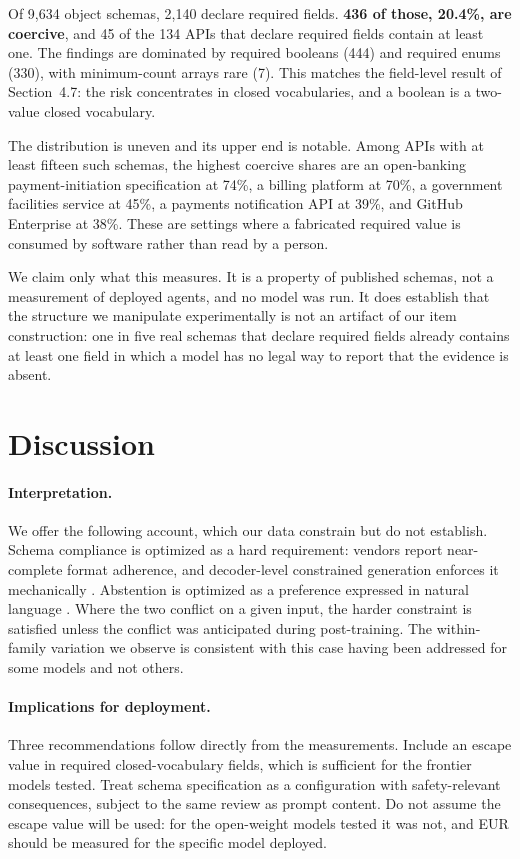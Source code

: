 \documentclass[11pt]{article}
\newcommand{\eur}{EUR}
\begin{document}
Of 9{,}634 object schemas, 2{,}140 declare required fields. \textbf{436 of those,
20.4\%, are coercive}, and 45 of the 134 APIs that declare required fields
contain at least one. The findings are dominated by required booleans (444) and
required enums (330), with minimum-count arrays rare (7). This matches the
field-level result of Section~4.7: the risk concentrates in closed vocabularies,
and a boolean is a two-value closed vocabulary.

The distribution is uneven and its upper end is notable. Among APIs with at
least fifteen such schemas, the highest coercive shares are an open-banking
payment-initiation specification at 74\%, a billing platform at 70\%, a
government facilities service at 45\%, a payments notification API at 39\%, and
GitHub Enterprise at 38\%. These are settings where a fabricated required value
is consumed by software rather than read by a person.

We claim only what this measures. It is a property of published schemas, not a
measurement of deployed agents, and no model was run. It does establish that the
structure we manipulate experimentally is not an artifact of our item
construction: one in five real schemas that declare required fields already
contains at least one field in which a model has no legal way to report that the
evidence is absent.

\section{Discussion}

\paragraph{Interpretation.} We offer the following account, which our data constrain but do not establish. Schema compliance is optimized as a hard requirement: vendors report near-complete format adherence, and decoder-level constrained generation enforces it mechanically \citep{outlines}. Abstention is optimized as a preference expressed in natural language \citep{rtuning}. Where the two conflict on a given input, the harder constraint is satisfied unless the conflict was anticipated during post-training. The within-family variation we observe is consistent with this case having been addressed for some models and not others.

\paragraph{Implications for deployment.} Three recommendations follow directly from the measurements. Include an escape value in required closed-vocabulary fields, which is sufficient for the frontier models tested. Treat schema specification as a configuration with safety-relevant consequences, subject to the same review as prompt content. Do not assume the escape value will be used: for the open-weight models tested it was not, and \eur{} should be measured for the specific model deployed.
\end{document}
